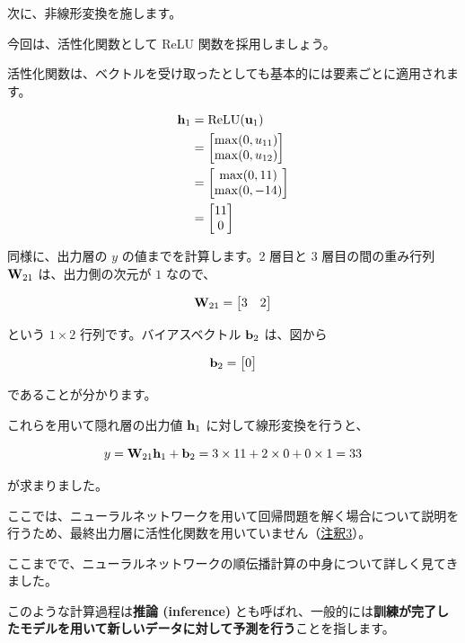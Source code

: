 次に、非線形変換を施します。

今回は、活性化関数として ReLU 関数を採用しましょう。

活性化関数は、ベクトルを受け取ったとしても基本的には要素ごとに適用されます。


\begin{align}
{\bf h}_1 &= {\rm ReLU}({\bf u}_1) \\
&=
\begin{bmatrix}
\max(0, u_{11}) \\
\max(0, u_{12})
\end{bmatrix} \\
&=
\begin{bmatrix}
\max(0, 11) \\
\max(0, -14)
\end{bmatrix} \\
&=
\begin{bmatrix}
11 \\
0
\end{bmatrix}
\end{align}


同様に、出力層の $y$ の値までを計算します。2 層目と 3 層目の間の重み行列 ${\bf W}_{21}$ は、出力側の次元が $1$ なので、


\[
{\bf W}_{21} = \begin{bmatrix} 3 & 2 \end{bmatrix}
\]


という $1 \times 2$ 行列です。バイアスベクトル ${\bf b}_2$ は、図から


\[
{\bf b}_2 = \begin{bmatrix} 0 \end{bmatrix}
\]


であることが分かります。

これらを用いて隠れ層の出力値 ${\bf h}_1$ に対して線形変換を行うと、


\[
y = {\bf W}_{21} {\bf h}_1 + {\bf b}_2 = 3 \times 11 + 2 \times 0 + 0 \times 1  = 33
\]


が求まりました。

ここでは、ニューラルネットワークを用いて回帰問題を解く場合について説明を行うため、最終出力層に活性化関数を用いていません（\hyperref[23-basics-of-neural-networks-note3]{注釈3}）。


ここまでで、ニューラルネットワークの順伝播計算の中身について詳しく見てきました。


このような計算過程は\textbf{推論 (inference)} とも呼ばれ、一般的には\textbf{訓練が完了したモデルを用いて新しいデータに対して予測を行う}ことを指します。

